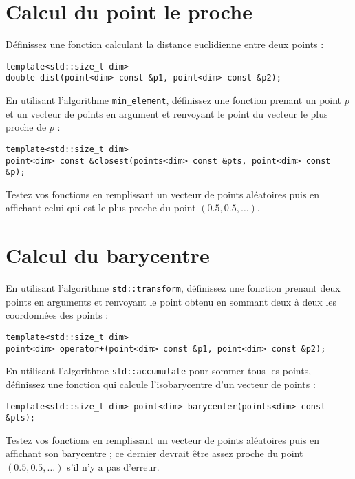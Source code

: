 \documentclass[a4paper]{article}
\begin{document}
\section{Calcul du point le proche}

Définissez une fonction calculant la distance euclidienne entre deux points :
\begin{lstlisting}
template<std::size_t dim>
double dist(point<dim> const &p1, point<dim> const &p2);
\end{lstlisting}

En utilisant l'algorithme \lstinline|min_element|, définissez une
fonction prenant un point $p$ et un vecteur de points en argument et
renvoyant le point du vecteur le plus proche de $p$ :
\begin{lstlisting}
template<std::size_t dim>
point<dim> const &closest(points<dim> const &pts, point<dim> const &p);
\end{lstlisting}

Testez vos fonctions en remplissant un vecteur de points aléatoires puis
en affichant celui qui est le plus proche du point $(0.5, 0.5, \ldots)$.

\section{Calcul du barycentre}

En utilisant l'algorithme \lstinline|std::transform|, définissez une
fonction prenant deux points en arguments et renvoyant le point obtenu en
sommant deux à deux les coordonnées des points :
\begin{lstlisting}
template<std::size_t dim>
point<dim> operator+(point<dim> const &p1, point<dim> const &p2);
\end{lstlisting}

En utilisant l'algorithme \lstinline|std::accumulate| pour sommer tous
les points, définissez une fonction qui calcule l'isobarycentre d'un
vecteur de points :
\begin{lstlisting}
template<std::size_t dim> point<dim> barycenter(points<dim> const &pts);
\end{lstlisting}

Testez vos fonctions en remplissant un vecteur de points aléatoires puis
en affichant son barycentre ; ce dernier devrait être assez proche du
point $(0.5, 0.5, \ldots)$ s'il n'y a pas d'erreur.
\end{document}
